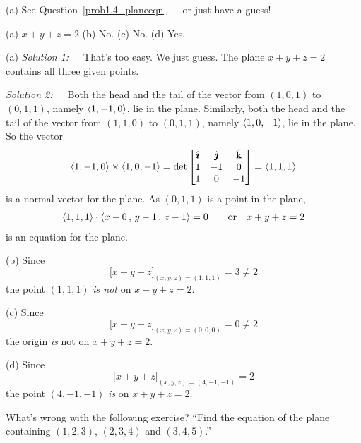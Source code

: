 \begin{hint}
(a) See Question~\ref{prob1.4_planeeqn} --- or just have a guess!
\end{hint}

\begin{answer}
(a) $x+y+z=2$ \qquad
(b) No.\qquad
(c) No. \qquad
(d) Yes.
\end{answer}

\begin{solution}
(a)
\emph{Solution 1:}\ \ \ That's too easy. We just guess.
The plane $x+y+z=2$ contains all three given points.

\emph{Solution 2:}\ \ \ 
Both the head and the tail of the vector from $(1,0,1)$ to $(0,1,1)$,
namely $\left< 1,-1,0\right>$, lie in the plane. Similarly, 
both the head and the tail of the vector from $(1,1,0)$ to $(0,1,1)$,
namely $\left< 1,0,-1\right>$, lie in the plane. So the vector
\begin{align*}
\left< 1,-1,0\right> \times \left< 1,0,-1\right>
=\det\left[\begin{matrix}
           \hat{\pmb{\imath}} & \hat{\pmb{\jmath}} & \hat{\mathbf{k}} \\
           1  &  -1  &  0 \\
           1  &  0  &  -1
  \end{matrix}\right]
=\left< 1 , 1 ,1  \right>
\end{align*}
is a normal vector for the plane. As $(0,1,1)$ is a point in the plane,
\begin{align*}
\left< 1 , 1 ,1 \right> \cdot \left< x-0\,,\,y-1\,,\, z-1 \right> = 0\qquad
\text{or}\quad
x+y+z=2
\end{align*}
is an equation for the plane.

(b)
Since
\begin{equation*}
\Big[x+y+z\Big]_{(x,y,z)=(1,1,1)} = 3\ne 2
\end{equation*}
the point $(1,1,1)$ \emph{is not} on $x+y+z=2$.

(c)
Since
\begin{equation*}
\Big[x+y+z\Big]_{(x,y,z)=(0,0,0)} = 0\ne 2
\end{equation*}
the origin \emph{is} not on $x+y+z=2$.

(d)
Since
\begin{equation*}
\Big[x+y+z\Big]_{(x,y,z)=(4,-1,-1)} = 2
\end{equation*}
the point $(4,-1,-1)$ \emph{is} on $x+y+z=2$.


\end{solution}

\begin{question}
 What's wrong with the following exercise? ``Find the equation of the plane
containing $(1,2,3)$, $(2,3,4)$ and $(3,4,5)$.''
\end{question}

